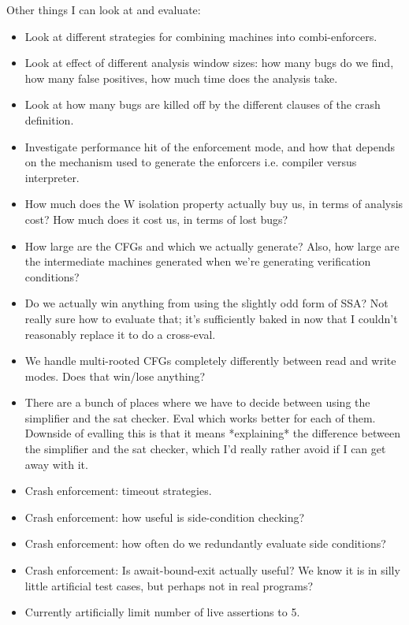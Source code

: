 Other things I can look at and evaluate:

\begin{itemize}
\item
  Look at different strategies for combining machines into
  combi-enforcers.
\item
  Look at effect of different analysis window sizes: how many bugs do
  we find, how many false positives, how much time does the analysis
  take.
\item
  Look at how many bugs are killed off by the different clauses of the
  crash definition.
\item
  Investigate performance hit of the enforcement mode, and how that
  depends on the mechanism used to generate the enforcers
  i.e. compiler versus interpreter.
\item
  How much does the W isolation property actually buy us, in terms of
  analysis cost?  How much does it cost us, in terms of lost bugs?
\item
  How large are the CFGs and \StateMachines which we actually
  generate?  Also, how large are the intermediate machines generated
  when we're generating verification conditions?
\item
  Do we actually win anything from using the slightly odd form of SSA?
  Not really sure how to evaluate that; it's sufficiently baked in now
  that I couldn't reasonably replace it to do a cross-eval.
\item
  We handle multi-rooted CFGs completely differently between read and
  write modes.  Does that win/lose anything?
\item
  There are a bunch of places where we have to decide between using
  the simplifier and the sat checker.  Eval which works better for
  each of them.  Downside of evalling this is that it means
  *explaining* the difference between the simplifier and the sat
  checker, which I'd really rather avoid if I can get away with it.
\item
  Crash enforcement: timeout strategies.
\item
  Crash enforcement: how useful is side-condition checking?
\item
  Crash enforcement: how often do we redundantly evaluate side conditions?
\item
  Crash enforcement: Is await-bound-exit actually useful?
  We know it is in silly little artificial test cases, but perhaps not in real programs?
\item
  Currently artificially limit number of live assertions to 5.

\end{itemize}
